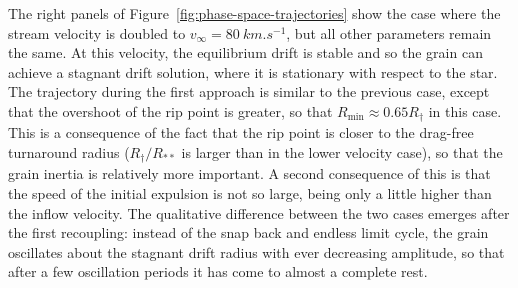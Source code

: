 \message{ !name(dusty-bow-wave.tex)}\documentclass[useAMS, usenatbib, a4paper]{mnras}
\newcommand\Rmin{\ensuremath{R_{\scriptscriptstyle\text{min}}}}
\newcommand\starstar{\ensuremath{_{**}}}
\begin{document}
The right panels of Figure~\ref{fig:phase-space-trajectories} show the
case where the stream velocity is doubled to
\(v_\infty = \SI{80}{km.s^{-1}}\), but all other parameters remain the
same.  At this velocity, the equilibrium drift is stable and so the
grain can achieve a stagnant drift solution, where it is stationary
with respect to the star.  The trajectory during the first approach is
similar to the previous case, except that the overshoot of the rip
point is greater, so that \(\Rmin \approx 0.65 R_\dag\) in this case.  This is
a consequence of the fact that the rip point is closer to the
drag-free turnaround radius (\(R_\dag / R\starstar\) is larger than in
the lower velocity case), so that the grain inertia is relatively more
important.  A second consequence of this is that the speed of the
initial expulsion is not so large, being only a little higher than the
inflow velocity.  The qualitative difference between the two cases
emerges after the first recoupling: instead of the snap back and
endless limit cycle, the grain oscillates about the stagnant drift
radius with ever decreasing amplitude, so that after a few oscillation
periods it has come to almost a complete rest.
\end{document}
